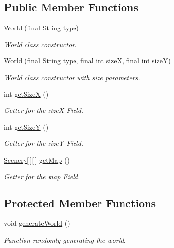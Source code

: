 \subsection*{Public Member Functions}
\begin{DoxyCompactItemize}
\item 
\hyperlink{a00039_afad8d3e3ce39f09fa0305fa412fc2080}{World} (final String \hyperlink{a00039_a008564127f7e69c09224a84ca7081893}{type})
\begin{DoxyCompactList}\small\item\em \hyperlink{a00039}{World} class constructor. \end{DoxyCompactList}\item 
\hyperlink{a00039_a59be3f314d90297f99652c9d45936425}{World} (final String \hyperlink{a00039_a008564127f7e69c09224a84ca7081893}{type}, final int \hyperlink{a00039_ab2ca92c9d2a56f6fa1872dc6cf0f4ab3}{size\-X}, final int \hyperlink{a00039_a3a110ad1276dc7dfa6bc47d9a663ec5e}{size\-Y})
\begin{DoxyCompactList}\small\item\em \hyperlink{a00039}{World} class constructor with size parameters. \end{DoxyCompactList}\item 
int \hyperlink{a00039_a2b90f767ed9a0227e1ba8733df76a73f}{get\-Size\-X} ()
\begin{DoxyCompactList}\small\item\em Getter for the size\-X Field. \end{DoxyCompactList}\item 
int \hyperlink{a00039_af74d811e8cc38adbb8a1e5a5cad9ac8d}{get\-Size\-Y} ()
\begin{DoxyCompactList}\small\item\em Getter for the size\-Y Field. \end{DoxyCompactList}\item 
\hyperlink{a00024}{Scenery}\mbox{[}$\,$\mbox{]}\mbox{[}$\,$\mbox{]} \hyperlink{a00039_a44ad3a40dc799585961fbb489950f812}{get\-Map} ()
\begin{DoxyCompactList}\small\item\em Getter for the map Field. \end{DoxyCompactList}\end{DoxyCompactItemize}
\subsection*{Protected Member Functions}
\begin{DoxyCompactItemize}
\item 
void \hyperlink{a00039_aad82a66d1f2f8a7c8afa0483692754e8}{generate\-World} ()
\begin{DoxyCompactList}\small\item\em Function randomly generating the world. \end{DoxyCompactList}\end{DoxyCompactItemize}
